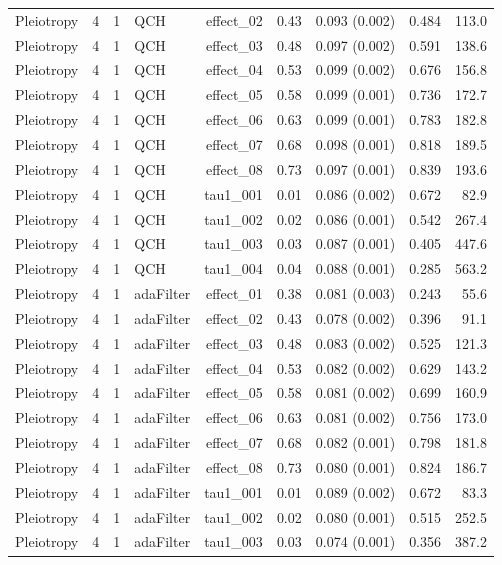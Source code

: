 \begin{longtable}{lcclrrrrr}
Pleiotropy & 4 & 1 & QCH & effect\_02 & 0.43 & 0.093 (0.002) & 0.484 & 113.0\\
Pleiotropy & 4 & 1 & QCH & effect\_03 & 0.48 & 0.097 (0.002) & 0.591 & 138.6\\
Pleiotropy & 4 & 1 & QCH & effect\_04 & 0.53 & 0.099 (0.002) & 0.676 & 156.8\\
Pleiotropy & 4 & 1 & QCH & effect\_05 & 0.58 & 0.099 (0.001) & 0.736 & 172.7\\
Pleiotropy & 4 & 1 & QCH & effect\_06 & 0.63 & 0.099 (0.001) & 0.783 & 182.8\\
Pleiotropy & 4 & 1 & QCH & effect\_07 & 0.68 & 0.098 (0.001) & 0.818 & 189.5\\
Pleiotropy & 4 & 1 & QCH & effect\_08 & 0.73 & 0.097 (0.001) & 0.839 & 193.6\\
Pleiotropy & 4 & 1 & QCH & tau1\_001 & 0.01 & 0.086 (0.002) & 0.672 & 82.9\\
Pleiotropy & 4 & 1 & QCH & tau1\_002 & 0.02 & 0.086 (0.001) & 0.542 & 267.4\\
Pleiotropy & 4 & 1 & QCH & tau1\_003 & 0.03 & 0.087 (0.001) & 0.405 & 447.6\\
Pleiotropy & 4 & 1 & QCH & tau1\_004 & 0.04 & 0.088 (0.001) & 0.285 & 563.2\\
Pleiotropy & 4 & 1 & adaFilter & effect\_01 & 0.38 & 0.081 (0.003) & 0.243 & 55.6\\
Pleiotropy & 4 & 1 & adaFilter & effect\_02 & 0.43 & 0.078 (0.002) & 0.396 & 91.1\\
Pleiotropy & 4 & 1 & adaFilter & effect\_03 & 0.48 & 0.083 (0.002) & 0.525 & 121.3\\
Pleiotropy & 4 & 1 & adaFilter & effect\_04 & 0.53 & 0.082 (0.002) & 0.629 & 143.2\\
Pleiotropy & 4 & 1 & adaFilter & effect\_05 & 0.58 & 0.081 (0.002) & 0.699 & 160.9\\
Pleiotropy & 4 & 1 & adaFilter & effect\_06 & 0.63 & 0.081 (0.002) & 0.756 & 173.0\\
Pleiotropy & 4 & 1 & adaFilter & effect\_07 & 0.68 & 0.082 (0.001) & 0.798 & 181.8\\
Pleiotropy & 4 & 1 & adaFilter & effect\_08 & 0.73 & 0.080 (0.001) & 0.824 & 186.7\\
Pleiotropy & 4 & 1 & adaFilter & tau1\_001 & 0.01 & 0.089 (0.002) & 0.672 & 83.3\\
Pleiotropy & 4 & 1 & adaFilter & tau1\_002 & 0.02 & 0.080 (0.001) & 0.515 & 252.5\\
Pleiotropy & 4 & 1 & adaFilter & tau1\_003 & 0.03 & 0.074 (0.001) & 0.356 & 387.2\\

\end{longtable}
